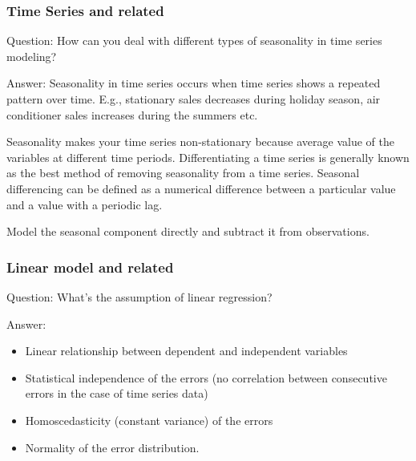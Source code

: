 \documentclass[11pt]{beamer}
\begin{document}
\begin{frame}
\frametitle{Time Series and related}
\begin{block}{Question:}
	How can you deal with different types of seasonality in time series modeling?
\end{block}
\begin{block}{Answer:}
	Seasonality in time series occurs when time series shows a repeated pattern over time. E.g., stationary sales decreases during holiday season, air conditioner sales increases during the summers etc.
	
	Seasonality makes your time series non-stationary because average value of the variables at different time periods. Differentiating a time series is generally known as the best method of removing seasonality from a time series. Seasonal differencing can be defined as a numerical difference between a particular value and a value with a periodic lag.
	
	Model the seasonal component directly and subtract it from observations.
\end{block}
\end{frame}

\begin{frame}
\frametitle{Linear model and related}
\begin{block}{Question:}
	What’s the assumption of linear regression?
\end{block}
\begin{block}{Answer:}
	\begin{itemize}
		\item Linear relationship between dependent and independent variables
		\item Statistical independence of the errors (no correlation between consecutive errors in the case of time series data)
		\item Homoscedasticity (constant variance) of the errors
		\item Normality of the error distribution.
	\end{itemize}
\end{block}
\end{frame}
\end{document}
